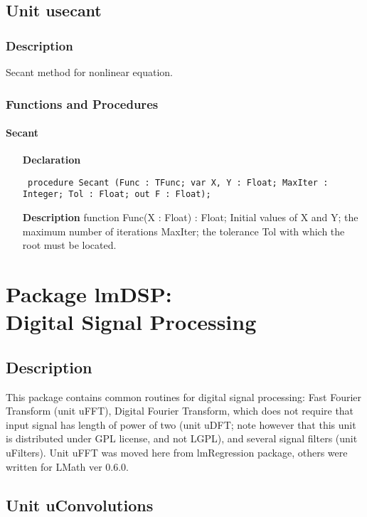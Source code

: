 \documentclass[12pt,a4paper,oneside]{report}
\newcommand{\lmathsix}[1]{   %
	\marginpar{\vspace{#1} 
		\begin{flushright}
			LMath 0.6
	\end{flushright} }
}
\newcommand{\declarationitem}[1]{\textbf{#1}}
\newcommand{\descriptiontitle}[1]{\textbf{#1}}
\newcommand{\code}[1]{\texttt{#1}}
\begin{document}
\section{Unit usecant}
\label{usecant}
\subsection{Description}
Secant method for nonlinear equation.
\subsection{Functions and Procedures}
\subsubsection{Secant}
\label{usecant-Secant}
\begin{itemize}\item[\declarationitem{Declaration}\hfill]
	\begin{flushleft}
		\code{
			procedure Secant (Func : TFunc; var X, Y : Float; MaxIter : Integer; Tol : Float; out F : Float);}
	\end{flushleft}
	\item[\descriptiontitle{Description}]
	function Func(X : Float) : Float; Initial values of X and Y; the maximum number of iterations MaxIter; the tolerance Tol with which the root must be located.
	
\end{itemize}

\chapter[Package lmDSP]{Package lmDSP:\\ Digital Signal Processing}\label{package-lmDSP}
\section{Description}
This package contains common routines for digital signal processing: Fast Fourier Transform (unit uFFT), Digital Fourier Transform, which does not require that input signal has length of power of two (unit uDFT; note however that this unit is distributed under GPL license, and not LGPL), and several signal filters (unit uFilters). Unit uFFT was moved here from lmRegression package, others were written for LMath ver 0.6.0. 
\section{Unit uConvolutions}\label{sec:uconvolutions}\lmathsix{-24pt}
\end{document}
